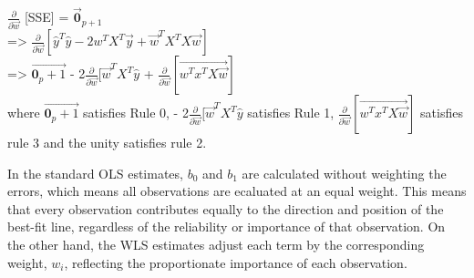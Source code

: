 \documentclass[12pt]{article}
\begin{document}
\begin{enumerate}
$\frac{\partial}{\partial \vec{w}}$ [SSE] =  ${\mathbf{\vec{0}}_{p+1}}$ \\
=> $\frac{\partial}{\partial \vec{w}}[\hat{y}^T\hat{y}-2w^T X^T \vec{y} + \vec{w}^T X^T X \vec{w}]$ \\
=> $\vec{\mathbf{0}_p+1}$ - 2$\frac{\partial}{\partial \vec{w}} [\vec{w}^T X^T \hat{y}$ + $\frac{\partial}{\partial \vec{w}} [\vec{w^T x^T X \vec{w}}]$ \\

where  $\vec{\mathbf{0}_p+1}$ satisfies Rule 0, - 2$\frac{\partial}{\partial \vec{w}} [\vec{w}^T X^T \hat{y}$ satisfies Rule 1, $\frac{\partial}{\partial \vec{w}} [\vec{w^T x^T X \vec{w}}]$ satisfies rule 3 and the unity satisfies rule 2.








In the standard OLS estimates, \(b_0\) and \(b_1\) are calculated without weighting the errors, which means all observations are ecaluated at an equal weight. This means that every observation contributes equally to the direction and position of the best-fit line, regardless of the reliability or importance of that observation. On the other hand, the WLS estimates adjust each term by the corresponding weight, \(w_i\), reflecting the proportionate importance of each observation.



\end{enumerate}
\end{document}

